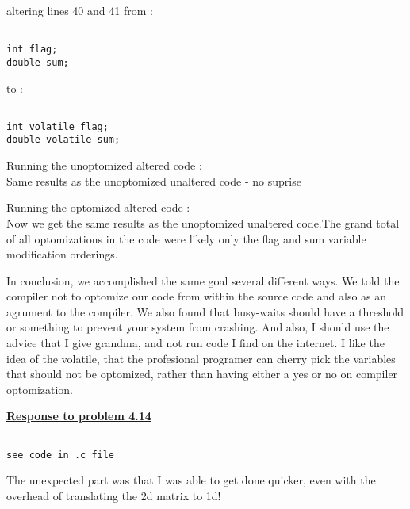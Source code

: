 \documentclass{article}
\begin{document}
\bigskip

\noindent altering lines 40 and 41 from :

\begin{lstlisting}

int flag;
double sum;

\end{lstlisting}

\noindent to : 

\begin{lstlisting}

int volatile flag;
double volatile sum;

\end{lstlisting}

Running the unoptomized altered code : \\
Same results as the unoptomized unaltered code - no suprise

Running the optomized altered code : \\
Now we get the same results as the unoptomized unaltered code.The grand
total of all optomizations in the code were likely only the flag and sum
variable modification orderings.

\bigskip
In conclusion, we accomplished the same goal several different ways.
We told the compiler not to optomize our code from within the source
code and also as an agrument to the compiler. We also found that busy-waits
should have a threshold or something to prevent your system from crashing.
And also, I should use the advice that I give grandma, and not run code
I find on the internet. I like the idea of the volatile, that the profesional programer can cherry
pick the variables that should not be optomized, rather than having either a
yes or no on compiler optomization. 

\break

\noindent \textbf{\underline{Response to problem 4.14}}

\bigskip

\begin{lstlisting}

see code in .c file

\end{lstlisting}

The unexpected part was that I was able to get done quicker, even with the overhead of translating
the 2d matrix to 1d!
\end{document}
